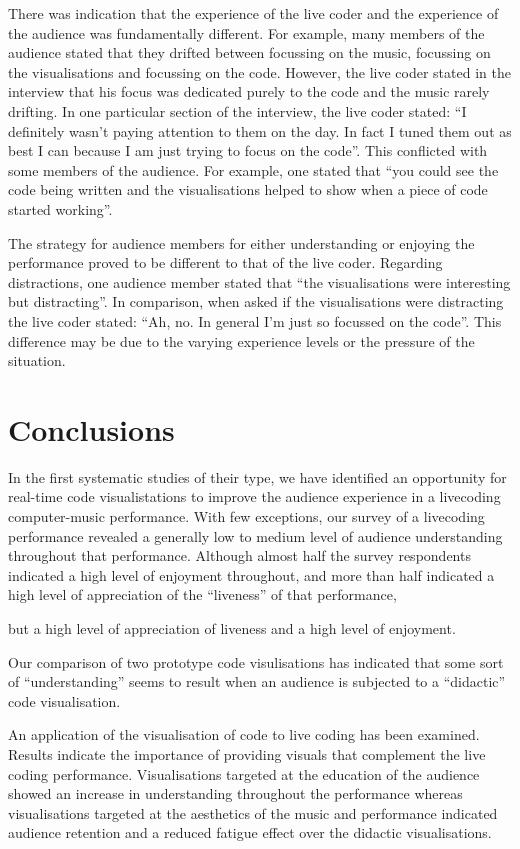 \documentclass{sig-alternate}
\begin{document}
There was indication that the experience of the live coder and the experience of the audience was fundamentally different. For example, many members of the audience stated that they drifted between focussing on the music, focussing on the visualisations and focussing on the code. However, the live coder stated in the interview that his focus was dedicated purely to the code and the music rarely drifting. In one particular section of the interview, the live coder stated: ``I definitely wasn't paying attention to them on the day. In fact I tuned them out as best I can because I am just trying to focus on the code''. This conflicted with some members of the audience. For example, one stated that ``you could see the code being written and the visualisations helped to show when a piece of code started working''. 

The strategy for audience members for either understanding or enjoying the performance proved to be different to that of the live coder. Regarding distractions, one audience member stated that ``the visualisations were interesting but distracting''. In comparison, when asked if the visualisations were distracting the live coder stated: ``Ah, no. In general I'm just so focussed on the code''. This difference may be due to the varying experience levels or the pressure of the situation.

\section{Conclusions}

In the first systematic studies of their type, we have identified an opportunity for real-time code visualistations to improve the audience experience in a livecoding computer-music performance. With few exceptions, our survey of a livecoding performance revealed a generally low to medium level of audience understanding throughout that performance. Although almost half the survey respondents indicated a high level of enjoyment throughout, and more than half indicated a high level of appreciation of the ``liveness'' of that performance, 

 but a high level of appreciation of liveness and a high level of enjoyment. 

 Our comparison of two prototype code visulisations has indicated that some sort of ``understanding'' seems to result when an audience is subjected to a ``didactic'' code visualisation. 


An application of the visualisation of code to live coding has been examined. Results indicate the importance of providing visuals that complement the live coding performance. Visualisations targeted at the education of the audience showed an increase in understanding throughout the performance whereas visualisations targeted at the aesthetics of the music and performance indicated audience retention and a reduced fatigue effect over the didactic visualisations.
\end{document}
